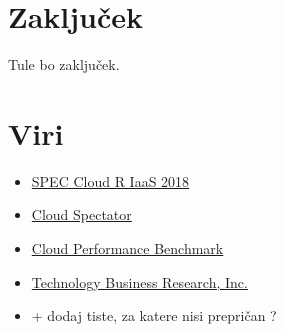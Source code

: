 








\section{Zaključek}
Tule bo zaključek.

\section{Viri}

\begin{itemize}
	\item \href{https://www.spec.org/cloud_iaas2018/results/res2019q4/cloudiaas2018-20191113-00005.html}{SPEC Cloud R IaaS 2018}
	\item \href{https://cloudspectator.com/wp-content/uploads/2019/10/2018_Top10_NA_v1.3.pdf}{Cloud Spectator}
	\item \href{https://blog.thousandeyes.com/top-takeaways-cloud-performance-benchmark/}{Cloud Performance Benchmark}
	\item \href{https://tbri.com/tbr-difference/}{Technology Business Research, Inc.}
	\item + dodaj tiste, za katere nisi prepričan ?
\end{itemize}